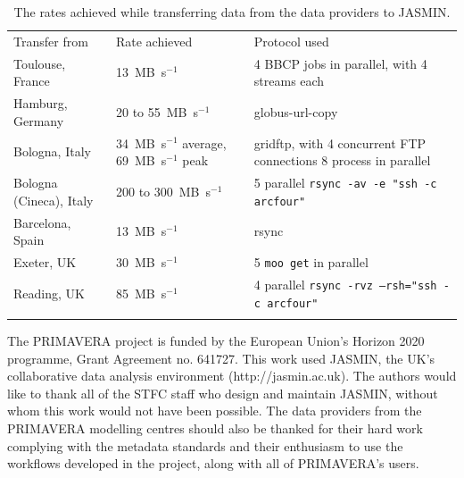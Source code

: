 \documentclass[gmd, manuscript]{copernicus}
\begin{document}
\appendixfigures  %

\appendixtables   %

\begin{table}[t]
	\caption{The rates achieved while transferring data from the data providers to JASMIN.}
	\begin{tabular}{lll}
		\tophline
		Transfer from & Rate achieved & Protocol used \\
		\middlehline
		Toulouse, France & 13~MB~s$^{-1}$ & 4 BBCP jobs in parallel, with 4 streams each \\
		Hamburg, Germany & 20 to 55~MB~s$^{-1}$ & globus-url-copy \\
		Bologna, Italy & 34~MB~s$^{-1}$ average, 69~MB~s$^{-1}$ peak & gridftp, with 4 concurrent FTP connections 8 process in parallel \\
		Bologna (Cineca), Italy & 200 to 300~MB~s$^{-1}$ & 5 parallel \texttt{rsync -av -e "ssh -c arcfour"} \\
		Barcelona, Spain & 13~MB~s$^{-1}$ & rsync \\
		Exeter, UK & 30~MB~s$^{-1}$ & 5 \texttt{moo get} in parallel \\
		Reading, UK & 85~MB~s$^{-1}$ & 4 parallel \texttt{rsync -rvz --rsh="ssh -c arcfour"} \\
		\bottomhline
	\end{tabular}
	\belowtable{} %
	\label{rates_achieved}
\end{table}








\begin{acknowledgements}
The PRIMAVERA project is funded by the European Union's Horizon 2020 programme, Grant Agreement no. 641727. This work used JASMIN, the UK's collaborative data analysis environment (http://jasmin.ac.uk). The authors would like to thank all of the STFC staff who design and maintain JASMIN, without whom this work would not have been possible. The data providers from the PRIMAVERA modelling centres should also be thanked for their hard work complying with the metadata standards and their enthusiasm to use the workflows developed in the project, along with all of PRIMAVERA's users.
\end{acknowledgements}
\end{document}
